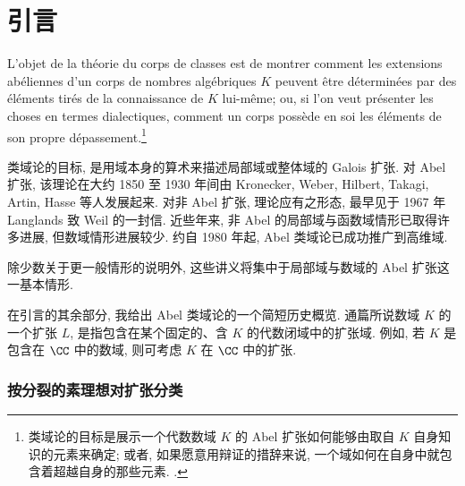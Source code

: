\chapter*{引言}

\renewcommand{\thetheorem}{0.\arabic{theorem}}
\setcounter{theorem}{0}

L'objet de la th\'eorie du corps de classes est de montrer comment les extensions ab\'eliennes d'un corps de nombres alg\'ebriques $K$ peuvent \^etre d\'etermin\'ees par des \'el\'ements tir\'es de la connaissance de $K$ lui-m\^eme; ou, si l'on veut pr\'esenter les choses en termes dialectiques, comment un corps poss\`ede en soi les \'el\'ements de son propre d\'epassement.\footnote{类域论的目标是展示一个代数数域 $K$ 的 Abel 扩张如何能够由取自 $K$ 自身知识的元素来确定; 或者, 如果愿意用辩证的措辞来说, 一个域如何在自身中就包含着超越自身的那些元素. \cite{Chevalley1940}.}

类域论的目标, 是用域本身的算术来描述局部域或整体域的 Galois 扩张. 对 Abel 扩张, 该理论在大约 1850 至 1930 年间由 Kronecker, Weber, Hilbert, Takagi, Artin, Hasse 等人发展起来. 对非 Abel 扩张, 理论应有之形态, 最早见于 1967 年 Langlands 致 Weil 的一封信\cite{LanglandsWeil1967}. 近些年来, 非 Abel 的局部域与函数域情形已取得许多进展, 但数域情形进展较少. 约自 1980 年起, Abel 类域论已成功推广到高维域.

除少数关于更一般情形的说明外, 这些讲义将集中于局部域与数域的 Abel 扩张这一基本情形.

在引言的其余部分, 我给出 Abel 类域论的一个简短历史概览. 通篇所说数域 $K$ 的一个扩张 $L$, 是指包含在某个固定的、含 $K$ 的代数闭域中的扩张域. 例如, 若 $K$ 是包含在 $\CC$ 中的数域, 则可考虑 $K$ 在 $\CC$ 中的扩张.

\subsection*{按分裂的素理想对扩张分类}

